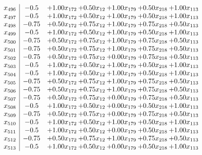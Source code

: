 \documentclass[8pt]{article}
\begin{document}
\[\begin{array}{c| c c@{\hskip 2pt} c@{\hskip 2pt} c@{\hskip 2pt} c@{\hskip 2pt} c@{\hskip 2pt} }
 x_{496}   &  -0.5 & +  1.00 x_{172} & +  0.50 x_{12} & +  1.00 x_{179} & +  0.50 x_{218} & +  1.00 x_{113}\\
 x_{497}   &  -0.5 & +  1.00 x_{172} & +  0.50 x_{12} & +  1.00 x_{179} & +  0.50 x_{218} & +  1.00 x_{113}\\
 x_{498}   &  -0.75 & +  0.50 x_{172} & +  0.75 x_{12} & +  1.00 x_{179} & +  0.75 x_{218} & +  0.50 x_{113}\\
 x_{499}   &  -0.5 & +  1.00 x_{172} & +  0.50 x_{12} & +  1.00 x_{179} & +  0.50 x_{218} & +  1.00 x_{113}\\
 x_{500}   &  -0.75 & +  0.50 x_{172} & +  0.75 x_{12} & +  1.00 x_{179} & +  0.75 x_{218} & +  0.50 x_{113}\\
 x_{501}   &  -0.75 & +  0.50 x_{172} & +  0.75 x_{12} & +  1.00 x_{179} & +  0.75 x_{218} & +  0.50 x_{113}\\
 x_{502}   &  -0.75 & +  0.50 x_{172} & +  0.75 x_{12} & +  0.00 x_{179} & +  0.75 x_{218} & +  0.50 x_{113}\\
 x_{503}   &  -0.5 & +  1.00 x_{172} & +  0.50 x_{12} & +  1.00 x_{179} & +  0.50 x_{218} & +  1.00 x_{113}\\
 x_{504}   &  -0.5 & +  1.00 x_{172} & +  0.50 x_{12} & +  1.00 x_{179} & +  0.50 x_{218} & +  1.00 x_{113}\\
 x_{505}   &  -0.75 & +  0.50 x_{172} & +  0.75 x_{12} & +  1.00 x_{179} & +  0.75 x_{218} & +  0.50 x_{113}\\
 x_{506}   &  -0.75 & +  0.50 x_{172} & +  0.75 x_{12} & +  1.00 x_{179} & +  0.75 x_{218} & +  0.50 x_{113}\\
 x_{507}   &  -0.75 & +  0.50 x_{172} & +  0.75 x_{12} & +  0.00 x_{179} & +  0.75 x_{218} & +  0.50 x_{113}\\
 x_{508}   &  -0.5 & +  1.00 x_{172} & +  0.50 x_{12} & +  0.00 x_{179} & +  0.50 x_{218} & +  1.00 x_{113}\\
 x_{509}   &  -0.75 & +  0.50 x_{172} & +  0.75 x_{12} & +  0.00 x_{179} & +  0.75 x_{218} & +  0.50 x_{113}\\
 x_{510}   &  -0.5 & +  1.00 x_{172} & +  0.50 x_{12} & +  1.00 x_{179} & +  0.50 x_{218} & +  1.00 x_{113}\\
 x_{511}   &  -0.5 & +  1.00 x_{172} & +  0.50 x_{12} & +  0.00 x_{179} & +  0.50 x_{218} & +  1.00 x_{113}\\
 x_{512}   &  -0.75 & +  0.50 x_{172} & +  0.75 x_{12} & +  1.00 x_{179} & +  0.75 x_{218} & +  0.50 x_{113}\\
 x_{513}   &  -0.5 & +  1.00 x_{172} & +  0.50 x_{12} & +  0.00 x_{179} & +  0.50 x_{218} & +  1.00 x_{113}\\

\end{array}\]
\end{document}
